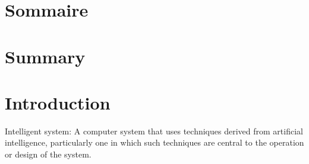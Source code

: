 \documentclass[12pt,initial,twoside,maitrise]{dms}
\numberwithin{equation}{section}
\numberwithin{table}{chapter}
\numberwithin{figure}{chapter}
\begin{document}

\francais

\chapter*{Sommaire}


\anglais
\chapter*{Summary}


\anglais
\cleardoublepage
{}  %
\tableofcontents
\cleardoublepage
{}  %
\listoftables
\cleardoublepage
{}
\listoffigures

\NoChapterPageNumber
\cleardoublepage
{}

\chapter{Introduction}

Intelligent system: A computer system that uses techniques derived from artificial intelligence, particularly one in which such techniques are central to the operation or design of the system.
\end{document}
